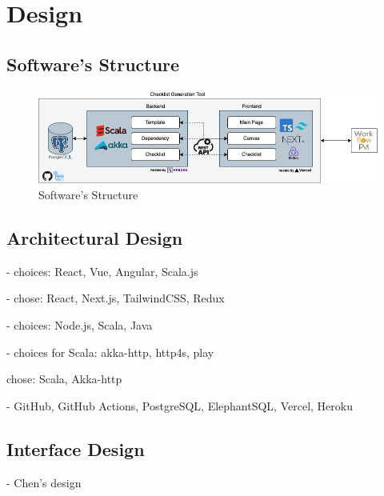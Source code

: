

\section{Design}

\subsection{Software's Structure}
\begin{figure}[ht]
    \centering
    \includegraphics[width=\textwidth]{overleaf/images/softwares_structure.png}
    \caption{Software's Structure}
    \label{fig:software_structure}
\end{figure}

\subsection{Architectural Design}
- choices: React, Vue, Angular, Scala.js

- chose: React, Next.js, TailwindCSS, Redux

- choices: Node.js, Scala, Java

- choices for Scala: akka-http, http4s, play

chose: Scala, Akka-http

- GitHub, GitHub Actions, PostgreSQL, ElephantSQL, Vercel, Heroku

\subsection{Interface Design}

- Chen's design \cite{checklistdesign}

